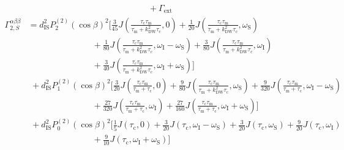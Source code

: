 \begin{appendixtext}
\begin{equation*}
\begin{split}
&\hspace{4pt} +\Gamma_{\text{ext}}
\end{split}
\end{equation*}
\begin{equation*}
\begin{split}
\Gamma_{2,S}^{\alpha\beta\beta}&=d_{\text{IS}}^2P_2^{(2)}(\cos\beta)^2\bigg[\frac{3}{45}J\left(\frac{\tau_{\text{c}}\tau_{\text{m}}}{\tau_{\text{m}}+k_{\text{DW}}^2\tau_{\text{c}}},0\right) + \frac{1}{20}J\left(\frac{\tau_{\text{c}}\tau_{\text{m}}}{\tau_{\text{m}}+k_{\text{DW}}^2\tau_{\text{c}}},\omega_{\text{S}}\right) \\
&\hspace{90pt}+ \frac{1}{80}J\left(\frac{\tau_{\text{c}}\tau_{\text{m}}}{\tau_{\text{m}}+k_{\text{DW}}^2\tau_{\text{c}}},\omega_{\text{I}}-\omega_{\text{S}}\right)+\frac{3}{80}J\left(\frac{\tau_{\text{c}}\tau_{\text{m}}}{\tau_{\text{m}}+k_{\text{DW}}^2\tau_{\text{c}}},\omega_{\text{I}}\right) \\
&\hspace{90pt}+\frac{3}{40}J\left(\frac{\tau_{\text{c}}\tau_{\text{m}}}{\tau_{\text{m}}+k_{\text{DW}}^2\tau_{\text{c}}},\omega_{\text{I}}+\omega_{\text{S}}\right)\bigg] \\
&\hspace{4pt}+d_{\text{IS}}^2P_1^{(2)}(\cos\beta)^2\bigg[\frac{3}{20}J\left(\frac{\tau_{\text{c}}\tau_{\text{m}}}{\tau_{\text{m}}+\tau_{\text{c}}},0\right)+ \frac{9}{80}J\left(\frac{\tau_{\text{c}}\tau_{\text{m}}}{\tau_{\text{m}}+k_{\text{DW}}^2\tau_{\text{c}}},\omega_{\text{S}}\right) + \frac{9}{320}J\left(\frac{\tau_{\text{c}}\tau_{\text{m}}}{\tau_{\text{m}}+\tau_{\text{c}}},\omega_{\text{I}}-\omega_{\text{S}}\right)\\
&\hspace{90pt} +\frac{27}{320}J\left(\frac{\tau_{\text{c}}\tau_{\text{m}}}{\tau_{\text{m}}+\tau_{\text{c}}},\omega_{\text{I}}\right) +\frac{27}{160}J\left(\frac{\tau_{\text{c}}\tau_{\text{m}}}{\tau_{\text{m}}+\tau_{\text{c}}},\omega_{\text{I}}+\omega_{\text{S}}\right)\bigg] \\
&\hspace{4pt}+d_{\text{IS}}^2P_0^{(2)}(\cos\beta)^2\bigg[\frac{1}{5}J(\tau_{\text{c}},0)+\frac{3}{20}J\left(\tau_{\text{c}},\omega_{\text{I}}-\omega_{\text{S}}\right)+\frac{3}{20}J\left(\tau_{\text{c}},\omega_{\text{S}}\right)+\frac{9}{20}J\left(\tau_{\text{c}},\omega_{\text{I}}\right) \\ 
&\hspace{90pt}+\frac{9}{10}J\left(\tau_{\text{c}},\omega_{\text{I}}+\omega_{\text{S}}\right)\bigg] \\

\end{split}
\end{equation*}
\end{appendixtext}

